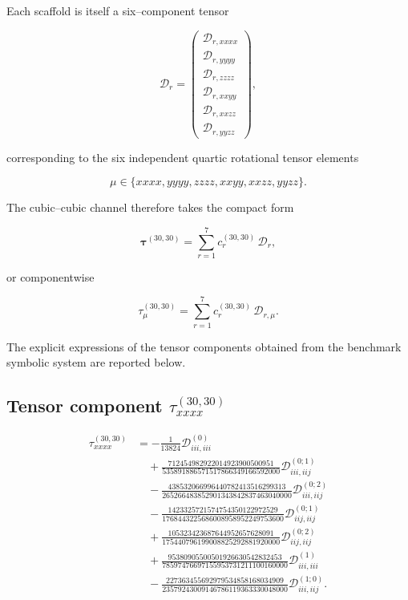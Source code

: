 \documentclass[aip,jcp,reprint]{revtex4-2}
\begin{document}
\begin{widetext}
Each scaffold is itself a six--component tensor

\begin{equation}
\mathcal{D}_r =
\begin{pmatrix}
\mathcal{D}_{r,xxxx} \\
\mathcal{D}_{r,yyyy} \\
\mathcal{D}_{r,zzzz} \\
\mathcal{D}_{r,xxyy} \\
\mathcal{D}_{r,xxzz} \\
\mathcal{D}_{r,yyzz}
\end{pmatrix},
\end{equation}

corresponding to the six independent quartic rotational tensor elements

\[
\mu \in
\{xxxx,yyyy,zzzz,xxyy,xxzz,yyzz\}.
\]

The cubic--cubic channel therefore takes the compact form

\begin{equation}
\bm{\tau}^{(30,30)}
=
\sum_{r=1}^{7}
c_r^{(30,30)}\,\bm{\mathcal{D}}_r ,
\end{equation}

or componentwise

\begin{equation}
\tau^{(30,30)}_\mu
=
\sum_{r=1}^{7}
c_r^{(30,30)}\,
\mathcal{D}_{r,\mu}.
\end{equation}

The explicit expressions of the tensor components obtained from the
benchmark symbolic system are reported below.

\subsection{Tensor component $\tau^{(30,30)}_{xxxx}$}

\begin{equation}
\begin{aligned}
\tau^{(30,30)}_{xxxx} &=
-\frac{1}{13824}\mathcal{D}^{(0)}_{iii,iii}
\\
&\quad
+ \frac{712454982922014923900500951}
       {535891886571517866349166592000}
  \mathcal{D}^{(0;1)}_{iii,iij}
\\
&\quad
- \frac{438532066996440782413516299313}
       {265266483852901343842837463040000}
  \mathcal{D}^{(0;2)}_{iii,iij}
\\
&\quad
- \frac{1423325721574754350122972529}
       {1768443225686008958952249753600}
  \mathcal{D}^{(0;1)}_{iij,iij}
\\
&\quad
+ \frac{105323423687644952657628091}
       {175440796199008825292881920000}
  \mathcal{D}^{(0;2)}_{iij,iij}
\\
&\quad
+ \frac{95380905500501926630542832453}
       {78597476697155953731211100160000}
  \mathcal{D}^{(1)}_{iii,iii}
\\
&\quad
- \frac{227363455692979534858168034909}
       {23579243009146786119363330048000}
  \mathcal{D}^{(1;0)}_{iii,iij}.
\end{aligned}
\end{equation}


\end{widetext}
\end{document}
